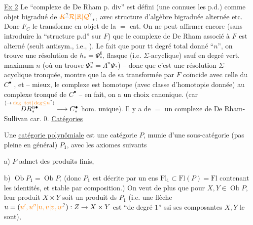 \uline{Ex 2} \quad Le ``complexe de De Rham  p. div''
est défini   (une 
connues les p.d.) comme 
objet bigradué de $\deleted{\unsure{K}}\unsure{\mathcal R|\mathbb R|\mathcal Q}_{*}$, avec
structure d'algèbre bigraduée alternée
etc. Donc $F_C$ le transforme en
objet de la $=$ cat. On ne peut
affirmer encore (sans introduire
la ``structure p.d'' sur $F$) que
le complexe de De Rham associé à $F$
est alterné (seult antisym., i.e.,
). Le fait que
pour tt degré total donné ``$n$'', on trouve
une résolution de $h_*=\Psi_*^0$, flasque
(i.e. $\Sigma$-acyclique) sauf en degré
vert. maximum $n$ (où on trouve $\Psi_*^n
=\Lambda^n\Psi_*$) -- donc que c'est une résolution
$\Sigma$-acyclique tronquée, montre que
la  de sa transformée par $F$
coïncide avec celle du $C^\bullet$ , et
 -- mieux,
le complexe est homotope (avec
classe d'homotopie donnée) au
complexe tronqué  de $C^\bullet$ --
en fait, on a un choix canonique.
(car $\overset{\inserted{\to\,\unsure{\deg\ \mathrm{tot}|\deg\leq n}}}{DR_*^{n\bullet}}\longrightarrow C^\bullet_*$ hom. \uline{unique}).
Il y a de $=$ un complexe de
De Rham-Sullivan  car. $0$.
\uline{Catégories} \uline{}

Une \uline{catégorie polynômiale} est une catégorie $P$,
munie d'une sous-catégorie (pas pleine en général)
$P_1$, avec les axiomes suivants

a) $P$ admet des produits finis, 

b) $\operatorname{Ob}P_1=\operatorname{Ob}P$,  (donc $P_1$ est décrite
par un ens $\mathrm{Fl}_1\subset\mathrm{Fl}(P)=\mathrm{Fl}$ contenant les identités,
et stable par composition.) On veut de plus que
 pour $X,Y\in\operatorname{Ob}P$,
leur produit $X\times Y$ soit un produit ds $P_1$
(i.e. une flèche $u=(\unsure{u',u''|u,v|v,w}) : Z\to X\times Y$ est
``de degré $1$'' ssi ses composantes $X,Y$ le sont),

